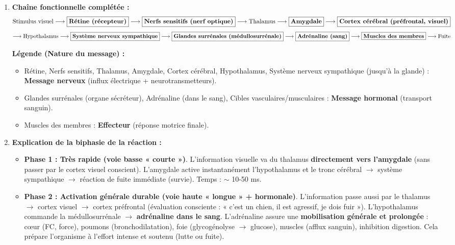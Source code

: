 \documentclass[11pt]{article}
\begin{document}
\begin{corrige}
\begin{enumerate}
\item \textbf{Chaîne fonctionnelle complétée :}
\[
\text{Stimulus visuel} \longrightarrow \fbox{\textbf{Rétine (récepteur)}} \longrightarrow \fbox{\textbf{Nerfs sensitifs (nerf optique)}} \longrightarrow \text{Thalamus} \longrightarrow \fbox{\textbf{Amygdale}} \longrightarrow \fbox{\textbf{Cortex cérébral (préfrontal, visuel)}}
\]
\[
\longrightarrow \text{Hypothalamus} \longrightarrow \fbox{\textbf{Système nerveux sympathique}} \longrightarrow \fbox{\textbf{Glandes surrénales (médullosurrénale)}} \longrightarrow \fbox{\textbf{Adrénaline (sang)}} \longrightarrow \fbox{\textbf{Muscles des membres}} \longrightarrow \text{Fuite}
\]

\textbf{Légende (Nature du message) :}
\begin{itemize}
\item Rétine, Nerfs sensitifs, Thalamus, Amygdale, Cortex cérébral, Hypothalamus, Système nerveux sympathique (jusqu'à la glande) : \textbf{Message nerveux} (influx électrique + neurotransmetteurs).
\item Glandes surrénales (organe sécréteur), Adrénaline (dans le sang), Cibles vasculaires/musculaires : \textbf{Message hormonal} (transport sanguin).
\item Muscles des membres : \textbf{Effecteur} (réponse motrice finale).
\end{itemize}
\item \textbf{Explication de la biphasie de la réaction :}
\begin{itemize}
\item \textbf{Phase 1 : Très rapide (voie basse « courte »)}. L'information visuelle va du thalamus \textbf{directement vers l'amygdale} (sans passer par le cortex visuel conscient). L'amygdale active instantanément l'hypothalamus et le tronc cérébral $\to$ système sympathique $\to$ réaction de fuite immédiate (survie). Temps : $\sim$ 10-50 ms.
\item \textbf{Phase 2 : Activation générale durable (voie haute « longue » + hormonale)}. L'information passe aussi par le thalamus $\to$ cortex visuel $\to$ cortex préfrontal (évaluation consciente : « c'est un chien, il est agressif, je dois fuir »). L'hypothalamus commande la médullosurrénale $\to$ \textbf{adrénaline dans le sang}. L'adrénaline assure une \textbf{mobilisation générale et prolongée} : cœur (FC, force), poumons (bronchodilatation), foie (glycogénolyse $\to$ glucose), muscles (afflux sanguin), inhibition digestion. Cela prépare l'organisme à l'effort intense et soutenu (lutte ou fuite).
\end{itemize}
\end{enumerate}
\end{corrige}
\end{document}
